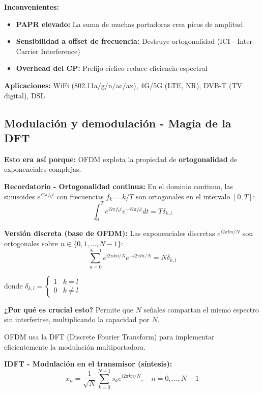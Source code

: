 \documentclass[10pt,a4paper]{article}
\begin{document}
\textbf{Inconvenientes:}
\begin{itemize}
\item \textbf{PAPR elevado:} La suma de muchas portadoras crea picos de amplitud
\item \textbf{Sensibilidad a offset de frecuencia:} Destruye ortogonalidad (ICI - Inter-Carrier Interference)
\item \textbf{Overhead del CP:} Prefijo cíclico reduce eficiencia espectral
\end{itemize}

\textbf{Aplicaciones:} WiFi (802.11a/g/n/ac/ax), 4G/5G (LTE, NR), DVB-T (TV digital), DSL

\subsection{Modulación y demodulación - Magia de la DFT}

\begin{tcolorbox}[colback=rojoclaro!10,colframe=rojoclaro,title=🧠 FUNDAMENTO MATEMÁTICO]
\textbf{Esto era así porque:} OFDM explota la propiedad de \textbf{ortogonalidad} de exponenciales complejas.

\textbf{Recordatorio - Ortogonalidad continua:}
En el dominio continuo, las sinusoides $e^{i2\pi f_k t}$ con frecuencias $f_k = k/T$ son ortogonales en el intervalo $[0,T]$:
$$\int_0^T e^{i2\pi f_k t} e^{-i2\pi f_l t} dt = T\delta_{k,l}$$

\textbf{Versión discreta (base de OFDM):}
Las exponenciales discretas $e^{i2\pi kn/N}$ son ortogonales sobre $n \in \{0,1,\ldots,N-1\}$:
$$\boxed{\sum_{n=0}^{N-1} e^{i2\pi kn/N} e^{-i2\pi ln/N} = N\delta_{k,l}}$$

donde $\delta_{k,l} = \begin{cases} 1 & k=l\\ 0 & k\neq l \end{cases}$

\textbf{¿Por qué es crucial esto?} Permite que $N$ señales compartan el mismo espectro sin interferirse, multiplicando la capacidad por $N$.
\end{tcolorbox}

OFDM usa la DFT (Discrete Fourier Transform) para implementar eficientemente la modulación multiportadora.

\textbf{IDFT - Modulación en el transmisor (síntesis):}
$$\boxed{x_n = \frac{1}{\sqrt{N}}\sum_{k=0}^{N-1} s_k e^{i2\pi kn/N}}, \quad n = 0,\ldots,N-1$$
\end{document}
